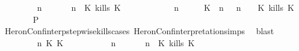 \begin{isabellebody}
\ \ \ \ \ \ \isamarkupfalse%
\ {\isacartoucheopen}{\isacharparenleft}{\isasymGamma}\ n\ {\isasymturnstile}\ {\isasymPsi}\ {\isasymtriangleright}\ {\isasymPhi}\ {\isacharequal}\ {\isacharparenleft}{\isasymGamma}{\isacharcomma}\ n\ {\isasymturnstile}\ {\isacharparenleft}{\isacharparenleft}K\ kills\ K\ {\isacharhash}\ {\isasymPsi}{\isacharparenright}\ {\isasymtriangleright}\ {\isasymPhi}{\isacharparenright}{\isacartoucheclose}\isanewline
\ \ \ \ \ \ \ {\isacartoucheopen}{\isacharparenleft}{\isasymGamma}\ n\ {\isasymturnstile}\ {\isasymPsi}\ {\isasymtriangleright}\ {\isasymPhi}\ {\isacharequal}\ {\isacharparenleft}{\isacharparenleft}{\isacharparenleft}K\ {\isasymnot}{\isasymUp}\ n{\isacharparenright}\ {\isacharhash}\ {\isasymGamma}{\isacharparenright}{\isacharcomma}\ n\ {\isasymturnstile}\ {\isasymPsi}\ {\isasymtriangleright}\ {\isacharparenleft}{\isacharparenleft}K\ kills\ K\ {\isacharhash}\ {\isasymPhi}{\isacharparenright}{\isacharparenright}{\isacartoucheclose}\isanewline
\ \ \ \ \ \ \isamarkupfalse%
\ {\isacharquery}P\isanewline
\ \ \ \ \ \ \ \ \isamarkupfalse%
\ HeronConf{\isacharunderscore}interp{\isacharunderscore}stepwise{\isacharunderscore}kills{\isacharunderscore}cases\ HeronConf{\isacharunderscore}interpretation{\isachardot}simps\ \isamarkupfalse%
\ blast\isanewline
\ \ \ \ \isamarkupfalse%
\isanewline
\ \ \ \ \ \ \isamarkupfalse%
\ {\isasymGamma}\ n\ K\ K\ {\isasymPsi}\ {\isasymPhi}\isanewline
\ \ \ \ \ \ \isamarkupfalse%
\ {\isacartoucheopen}{\isacharparenleft}{\isasymGamma}\ n\ {\isasymturnstile}\ {\isasymPsi}\ {\isasymtriangleright}\ {\isasymPhi}\ {\isacharequal}\ {\isacharparenleft}{\isasymGamma}{\isacharcomma}\ n\ {\isasymturnstile}\ {\isacharparenleft}{\isacharparenleft}K\ kills\ K\ {\isacharhash}\ {\isasymPsi}{\isacharparenright}\ {\isasymtriangleright}\ {\isasymPhi}{\isacharparenright}{\isacartoucheclose}\isanewline

\end{isabellebody}
